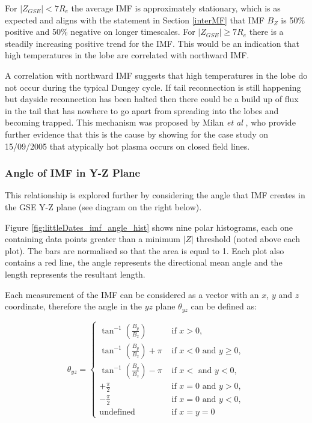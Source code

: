\documentclass[12pt]{article}
\begin{document}
For $|Z_{GSE}|<7R_e$ the average IMF is approximately stationary, which is as expected and aligns with the statement in Section \ref{interMF} that IMF $B_Z$ is 50\% positive and 50\% negative on longer timescales. For $|Z_{GSE}|\ge7R_e$ there is a steadily increasing positive trend for the IMF. This would be an indication that high temperatures in the lobe are correlated with northward IMF. 

A correlation with northward IMF suggests that high temperatures in the lobe do not occur during the typical Dungey cycle. If tail reconnection is still happening but dayside reconnection has been halted then there could be a build up of flux in the tail that has nowhere to go apart from spreading into the lobes and becoming trapped. This mechanism was proposed by Milan \textit{et al} \cite{TPAdebate}, who provide further evidence that this is the cause by showing for the case study on 15/09/2005 that atypically hot plasma occurs on closed field lines.

\subsubsection{Angle of IMF in Y-Z Plane}
This relationship is explored further by considering the angle that IMF creates in the GSE Y-Z plane (see diagram on the right below).

Figure \ref{fig:littleDates_imf_angle_hist} shows nine polar histograms, each one containing data points greater than a minimum $|Z|$ threshold (noted above each plot). The bars are normalised so that the area is equal to 1. Each plot also contains a red line, the angle represents the directional mean angle \cite{mardia_jupp_2000} and the length represents the resultant length. 

Each measurement of the IMF can be considered as a vector with an $x$, $y$ and $z$ coordinate, therefore the angle in the $yz$ plane $\theta_{yz}$ can be defined as:

\begin{equation}
    \theta_{yz}= 
    \begin{cases}
        \tan^{-1}\left(\frac{B_y}{B_z}\right) &\text{ if } x>0, \\
        \tan^{-1}\left(\frac{B_y}{B_z}\right)+\pi &\text{ if } x < 0 \text{ and } y \ge 0, \\
        \tan^{-1}\left(\frac{B_y}{B_z}\right)-\pi &\text{ if } x < \text{ and } y < 0, \\
        +\frac{\pi}{2} &\text{ if } x=0 \text{ and } y > 0, \\
        -\frac{\pi}{2} &\text{ if } x=0 \text{ and } y<0, \\
        \text{undefined} &\text{ if } x=y=0
    \end{cases}
\end{equation}
\end{document}
